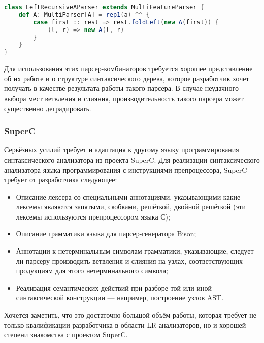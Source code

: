 \begin{minipage}{\linewidth}
\begin{lstlisting}[caption={Описание леворекурсивных правил с парсер-комбинаторами TypeChef},label=scalaleftrec,language=Scala]
class LeftRecursiveAParser extends MultiFeatureParser {
	def A: MultiParser[A] = rep1(a) ^^ {
		case first :: rest => rest.foldLeft(new A(first)) {
			(l, r) => new A(l, r)
		}
	}
}
\end{lstlisting}
\end{minipage}

Для использования этих парсер-комбинаторов требуется хорошее представление об их работе и о структуре синтаксического дерева, которое разработчик хочет получать в качестве результата работы такого парсера. В случае неудачного выбора мест ветвления и слияния, производительность такого парсера может существенно деградировать.

\subsubsection{SuperC}

Серьёзных усилий требует и адаптация к другому языку программирования синтаксического анализатора из проекта SuperC. Для реализации синтаксического анализатора языка программирования с инструкциями препроцессора, SuperC требует от разработчика следующее:

\begin{itemize}
\item Описание лексера со специальными аннотациями, указывающими какие лексемы являются запятыми, скобками, решёткой, двойной решёткой (эти лексемы используются препроцессором языка С);
\item Описание грамматики языка для парсер-генератора Bison;
\item Аннотации к нетерминальным символам грамматики, указывающие, следует ли парсеру производить ветвления и слияния на узлах, соответствующих продукциям для этого нетерминального символа;
\item Реализация семантических действий при разборе той или иной синтаксической конструкции --- например, построение узлов AST.
\end{itemize}

Хочется заметить, что это достаточно большой объём работы, которая требует не только квалификации разработчика в области LR анализаторов, но и хорошей степени знакомства с проектом SuperC.
